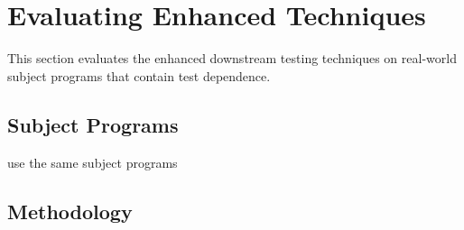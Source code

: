 
\section{Evaluating Enhanced Techniques}
\label{sec:evaluation}

This section evaluates the enhanced downstream
testing techniques on real-world subject programs
that contain test dependence.

\subsection{Subject Programs}

use the same subject programs

\subsection{Methodology}


